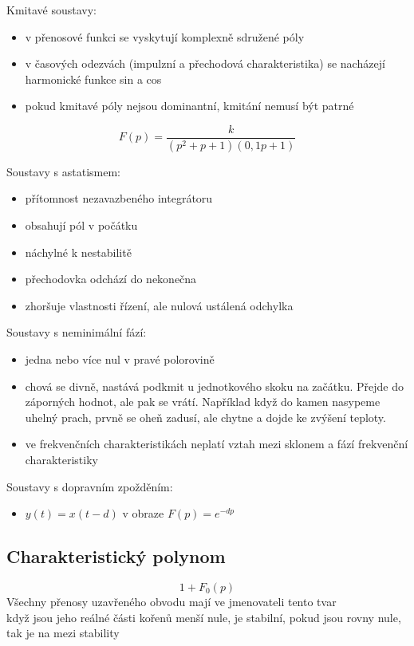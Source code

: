 Kmitavé soustavy:
\begin{itemize}
    \item v přenosové funkci se vyskytují komplexně sdružené póly
    \item v časových odezvách (impulzní a přechodová charakteristika) se nacházejí harmonické funkce sin a cos
    \item pokud kmitavé póly nejsou dominantní, kmitání nemusí být patrné
\end{itemize}
\begin{equation}
    F(p) = \frac{k}{(p^2+p+1)(0,1p+1)}
\end{equation}

Soustavy s astatismem:
\begin{itemize}
    \item přítomnost nezavazbeného integrátoru
    \item obsahují pól v počátku
    \item náchylné k nestabilitě
    \item přechodovka odchází do nekonečna
    \item zhoršuje vlastnosti řízení, ale nulová ustálená odchylka
\end{itemize}

Soustavy s neminimální fází:
\begin{itemize}
    \item jedna nebo více nul v pravé polorovině
    \item chová se divně, nastává podkmit u jednotkového skoku na začátku. Přejde do záporných hodnot, ale pak se vrátí. Například když do kamen nasypeme uhelný prach, prvně se oheň zadusí, ale chytne a dojde ke zvýšení teploty.
    \item ve frekvenčních charakteristikách neplatí vztah mezi sklonem a fází frekvenční charakteristiky
\end{itemize}

Soustavy s dopravním zpožděním:
\begin{itemize}
    \item $y(t) = x(t-d)$ v obraze $F(p) = e^{-dp}$
\end{itemize}
\newpage

\subsection*{Charakteristický polynom}
\begin{equation}
    1+F_0(p)
\end{equation}
Všechny přenosy uzavřeného obvodu mají ve jmenovateli tento tvar\\
když jsou jeho reálné části kořenů menší nule, je stabilní, pokud jsou rovny nule, tak je na mezi stability\\

